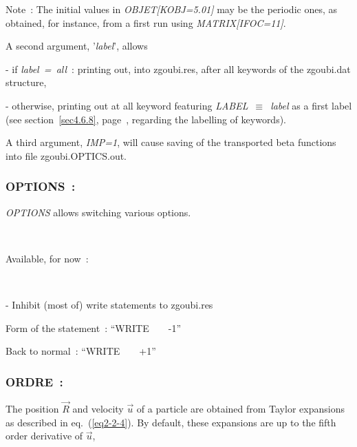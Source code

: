\medskip

\noindent  Note~:  The initial values  in \textsl{OBJET[KOBJ=5.01]} may be the periodic ones, as obtained, for instance, from a first run using \textsl{MATRIX[IFOC=11]}. 

\bigskip

\noindent A second argument,  '\textsl{label}',  allows 

- if \textsl{label~=~all}~: printing out, into zgoubi.res, after all keywords of the zgoubi.dat structure, 

- otherwise, printing out at all keyword featuring 
\textsl{LABEL}~$\equiv$~\textsl{label} as a first label  (see section~\ref{sec4.6.8}, page~\pageref{sec4.6.8}, regarding  
the labelling of keywords).


\bigskip

\noindent A third argument, \textsl{IMP=1}, will cause saving of the transported beta functions into 
file zgoubi.OPTICS.out.








\newpage

\subsubsection*{OPTIONS~: \OPTIONSTitl} \label{OPTIONS} 

\medskip

\textsl{OPTIONS} allows switching various options. 

~

\noindent Available, for now~: 

~

\noindent - Inhibit (most of) write statements to zgoubi.res

Form of the statement~: ``WRITE ~ ~   -1''

Back to normal~: ``WRITE ~ ~  +1''










 \newpage

\subsubsection*{ORDRE~: \ORDRETitl } \label{ORDRE} 
\medskip

 The position $ \vec  R $ and velocity $ \vec  u $ of a particle are
obtained from Taylor expansions as described in eq.~(\ref{eq2-2-4}). By default, these 
expansions are up to the fifth order derivative of $ \vec  u$, 

